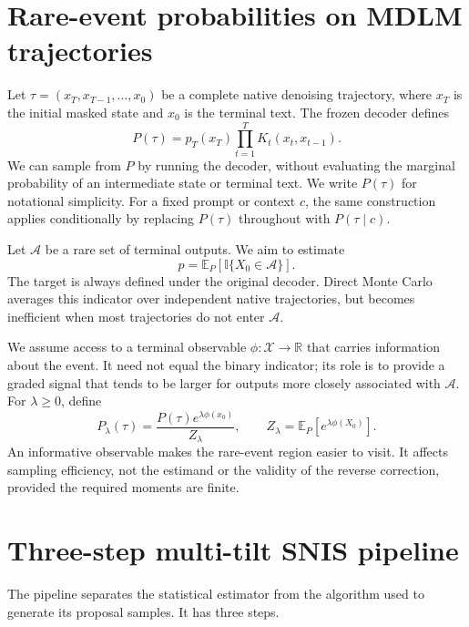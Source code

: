 \documentclass{article}
\newcommand{\E}{\mathbb{E}}
\newcommand{\ind}{\mathbb{I}}
\newcounter{algorithm}
\begin{document}
\section{Rare-event probabilities on MDLM trajectories}
\label{sec:problem}

Let $\tau=(x_T,x_{T-1},\ldots,x_0)$ be a complete native denoising
trajectory, where $x_T$ is the initial masked state and $x_0$ is the terminal
text. The frozen decoder defines
\begin{equation}
P(\tau)=p_T(x_T)\prod_{t=1}^{T}K_t(x_t,x_{t-1}).
\label{eq:path-law}
\end{equation}
We can sample from $P$ by running the decoder, without evaluating the marginal
probability of an intermediate state or terminal text.
We write $P(\tau)$ for notational simplicity. For a fixed prompt or context
$c$, the same construction applies conditionally by replacing $P(\tau)$
throughout with $P(\tau\mid c)$.

Let $\mathcal A$ be a rare set of terminal outputs. We aim to estimate
\begin{equation}
p=\E_P\!\left[\ind\{X_0\in\mathcal A\}\right].
\label{eq:estimand}
\end{equation}
The target is always defined under the original decoder. Direct Monte Carlo
averages this indicator over independent native trajectories, but becomes
inefficient when most trajectories do not enter $\mathcal A$.

We assume access to a terminal observable $\phi:\mathcal X\to\mathbb R$ that
carries information about the event. It need not equal the binary indicator;
its role is to provide a graded signal that tends to be larger for outputs more
closely associated with $\mathcal A$. For $\lambda\geq0$, define
\begin{equation}
P_\lambda(\tau)
=\frac{P(\tau)e^{\lambda\phi(x_0)}}{Z_\lambda},
\qquad
Z_\lambda=\E_P[e^{\lambda\phi(X_0)}].
\label{eq:tilt}
\end{equation}
An informative observable makes the rare-event region easier to visit. It
affects sampling efficiency, not the estimand or the validity of the reverse
correction, provided the required moments are finite.

\section{Three-step multi-tilt SNIS pipeline}
\label{sec:method}

The pipeline separates the statistical estimator from the algorithm used to
generate its proposal samples. It has three steps.
\end{document}
